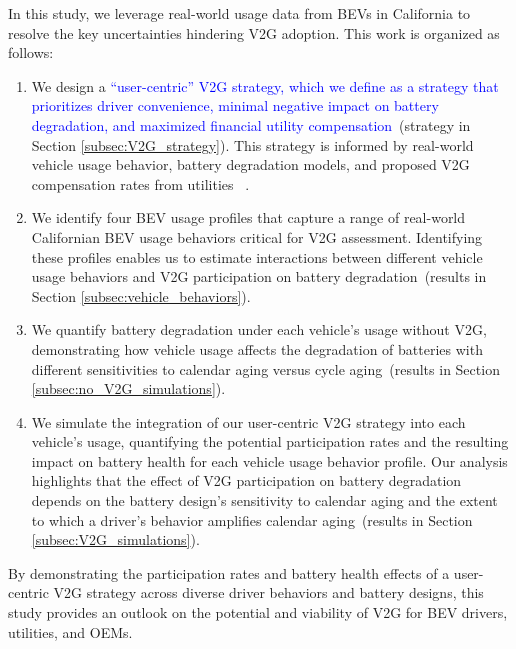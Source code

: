 \documentclass[pdflatex,sn-nature]{sn-jnl}%
\theoremstyle{thmstyleone}%
\theoremstyle{thmstyletwo}%
\theoremstyle{thmstylethree}%
\begin{document}
In this study, we leverage real-world usage data from BEVs in California to resolve the key uncertainties hindering V2G adoption. This work is organized as follows:
\begin{enumerate}
    \item We design a \textcolor{blue}{``user-centric'' V2G strategy, which we define as a strategy that prioritizes driver convenience, minimal negative impact on battery degradation, and maximized financial utility compensation}~(strategy in Section \ref{subsec:V2G_strategy}). This strategy is informed by real-world vehicle usage behavior, battery degradation models, and proposed V2G compensation rates from utilities ~\cite{SCE_V2G_pilot_program}.
    \item We identify four BEV usage profiles that capture a range of real-world Californian BEV usage behaviors critical for V2G assessment. Identifying these profiles enables us to estimate interactions between different vehicle usage behaviors and V2G participation on battery degradation~(results in Section \ref{subsec:vehicle_behaviors}).
    \item We quantify battery degradation under each vehicle’s usage without V2G, demonstrating how vehicle usage affects the degradation of batteries with different sensitivities to calendar aging versus cycle aging~(results in Section \ref{subsec:no_V2G_simulations}).
    \item We simulate the integration of our user-centric V2G strategy into each vehicle's usage, quantifying the potential participation rates and the resulting impact on battery health for each vehicle usage behavior profile. Our analysis highlights that the effect of V2G participation on battery degradation depends on the battery design’s sensitivity to calendar aging and the extent to which a driver’s behavior amplifies calendar aging~(results in Section \ref{subsec:V2G_simulations}). 
    
    
    
    
\end{enumerate}

By demonstrating the participation rates and battery health effects of a user-centric V2G strategy across diverse driver behaviors and battery designs, this study provides an outlook on the potential and viability of V2G for BEV drivers, utilities, and OEMs.
\end{document}
